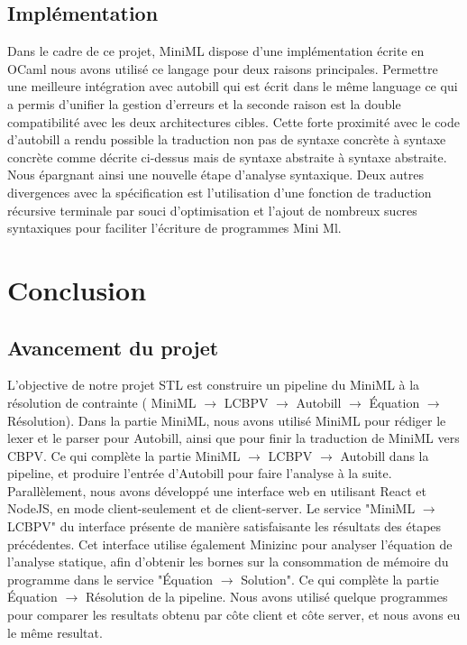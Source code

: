 \documentclass[12pt]{article}
\begin{document}
\hypertarget{Implémentation}{%
      \subsection{Implémentation}\label{Implementation}}
Dans le cadre de ce projet, MiniML dispose d'une implémentation écrite en OCaml nous avons utilisé ce langage pour deux raisons principales.
Permettre une meilleure intégration avec autobill qui est écrit dans le même language ce qui a permis d'unifier la gestion d'erreurs
et la seconde raison est la double compatibilité avec les deux architectures cibles.
Cette forte proximité avec le code d'autobill a rendu possible la traduction non pas de syntaxe concrète à syntaxe concrète comme décrite ci-dessus mais de syntaxe abstraite à syntaxe abstraite.
Nous épargnant ainsi une nouvelle étape d'analyse syntaxique.
Deux autres divergences avec la spécification est l'utilisation d'une fonction de traduction récursive terminale par souci d'optimisation et l'ajout de nombreux sucres syntaxiques pour faciliter l'écriture de programmes Mini Ml.


\hypertarget{conclusion}{%
      \section{Conclusion}\label{conclusion}}
\hypertarget{conclusion}{%
  \subsection{Avancement du projet}\label{Avancement du Projet}}

L'objective de notre projet STL est construire un pipeline du MiniML à la résolution de contrainte ( MiniML $\rightarrow$ LCBPV $\rightarrow$ Autobill $\rightarrow$ Équation $\rightarrow$ Résolution). Dans la partie MiniML, nous avons utilisé MiniML pour rédiger le lexer et le parser pour Autobill, ainsi que pour finir la traduction de MiniML vers CBPV. Ce qui complète la partie MiniML $\rightarrow$ LCBPV $\rightarrow$ Autobill dans la pipeline, et produire l'entrée d'Autobill pour faire l'analyse à la suite. Parallèlement, nous avons développé une interface web en utilisant React et NodeJS, en mode client-seulement et de client-server. Le service "MiniML $\rightarrow$ LCBPV" du interface présente de manière satisfaisante les résultats des étapes précédentes. Cet interface utilise également Minizinc pour analyser l'équation de l'analyse statique, afin d'obtenir les bornes sur la consommation de mémoire du programme dans le service "Équation $\rightarrow$ Solution". Ce qui complète la partie Équation $\rightarrow$ Résolution de la pipeline. Nous avons utilisé quelque programmes pour comparer  les resultats obtenu par côte client et côte server, et nous avons eu le même resultat.\\
\end{document}
